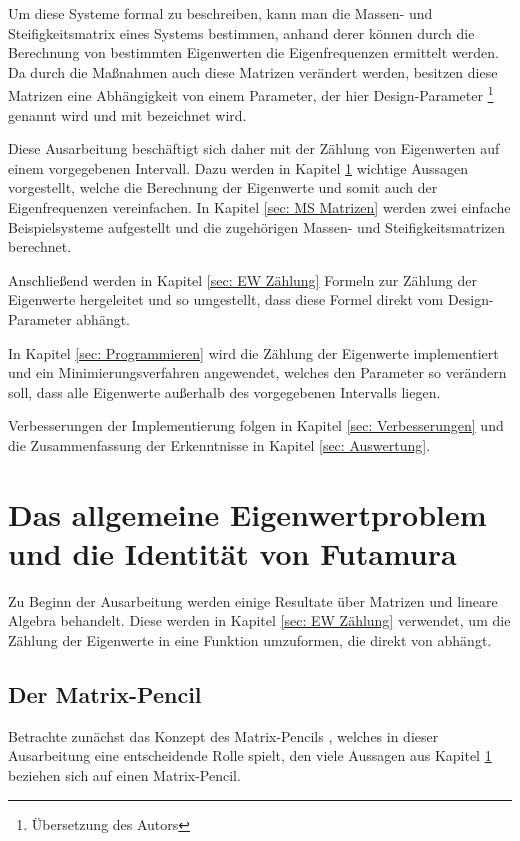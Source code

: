 \documentclass[a4paper,12pt]{report}
\newcommand{\zitat}[1]{\glqq #1\grqq}
\newcommand{\1}{\mathds{1}}
\theoremstyle{plain} %
\theoremstyle{definition} %
\theoremstyle{remark}
\begin{document}
      Um diese Systeme formal zu beschreiben, kann man die Massen- und Steifigkeitsmatrix eines Systems bestimmen, anhand derer können durch die Berechnung von bestimmten Eigenwerten die Eigenfrequenzen ermittelt werden.
      Da durch die Maßnahmen auch diese Matrizen verändert werden, besitzen diese Matrizen eine Abhängigkeit von einem Parameter, der hier \zitat{Design-Parameter} \cite[S. 2]{hauptteilTkachuk}\footnote{Übersetzung des Autors} genannt wird und mit \s bezeichnet wird.

      Diese Ausarbeitung beschäftigt sich daher mit der Zählung von Eigenwerten auf einem vorgegebenen Intervall. Dazu werden in Kapitel \ref{sec: EW Problem_Futamura} wichtige Aussagen vorgestellt, welche die Berechnung der Eigenwerte und somit auch der Eigenfrequenzen vereinfachen.
      In Kapitel \ref{sec: MS Matrizen} werden zwei einfache Beispielsysteme aufgestellt und die zugehörigen Massen- und Steifigkeitsmatrizen berechnet.

      Anschließend werden in Kapitel \ref{sec: EW Zählung} Formeln zur Zählung der Eigenwerte hergeleitet und so umgestellt, dass diese Formel direkt vom Design-Parameter \s abhängt.

      In Kapitel \ref{sec: Programmieren} wird die Zählung der Eigenwerte implementiert und ein Minimierungsverfahren angewendet, welches den Parameter \s so verändern soll, dass alle Eigenwerte außerhalb des vorgegebenen Intervalls liegen.

      Verbesserungen der Implementierung folgen in Kapitel \ref{sec: Verbesserungen} und die Zusammenfassung der Erkenntnisse in Kapitel \ref{sec: Auswertung}.

\chapter{Das allgemeine Eigenwertproblem und die Identität von Futamura}
\label{sec: EW Problem_Futamura}

      Zu Beginn der Ausarbeitung werden einige Resultate über Matrizen und lineare Algebra behandelt.
      Diese werden in Kapitel \ref{sec: EW Zählung} verwendet, um die Zählung der Eigenwerte in eine Funktion \J umzuformen, die direkt von \s abhängt.
      
      \section{Der Matrix-Pencil}
            Betrachte zunächst das Konzept des \zitat{Matrix-Pencils} \cite[S. 32]{matrixPencilDeutsch}, welches in dieser Ausarbeitung eine entscheidende Rolle spielt,
            den viele Aussagen aus Kapitel \ref{sec: EW Problem_Futamura} beziehen sich auf einen Matrix-Pencil.
      
\end{document}
